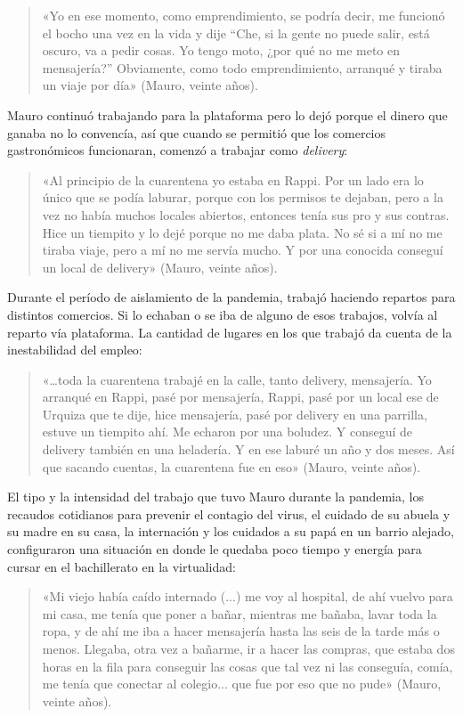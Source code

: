 \begin{quote}
«Yo en ese momento, como emprendimiento, se podría decir, me funcionó el bocho una vez en la vida y dije ``Che, si la gente no puede salir, está oscuro, va a pedir cosas. Yo tengo moto, ¿por qué no me meto en mensajería?'' Obviamente, como todo emprendimiento, arranqué y tiraba un viaje por día» (Mauro, veinte años).
\end{quote}

Mauro continuó trabajando para la plataforma pero lo dejó porque el dinero que ganaba no lo convencía, así que cuando se permitió que los comercios gastronómicos funcionaran, comenzó a trabajar como \emph{delivery}:

\begin{quote}
«Al principio de la cuarentena yo estaba en Rappi. Por un lado era lo único que se podía laburar, porque con los permisos te dejaban, pero a la vez no había muchos locales abiertos, entonces tenía sus pro y sus contras. Hice un tiempito y lo dejé porque no me daba plata. No sé si a mí no me tiraba viaje, pero a mí no me servía mucho. Y por una conocida conseguí un local de delivery» (Mauro, veinte años).
\end{quote}

Durante el período de aislamiento de la pandemia, trabajó haciendo repartos para distintos comercios. Si lo echaban o se iba de alguno de esos trabajos, volvía al reparto vía plataforma. La cantidad de lugares en los que trabajó da cuenta de la inestabilidad del empleo:

\begin{quote}
«\ldots toda la cuarentena trabajé en la calle, tanto delivery, mensajería. Yo arranqué en Rappi, pasé por mensajería, Rappi, pasé por un local ese de Urquiza que te dije, hice mensajería, pasé por delivery en una parrilla, estuve un tiempito ahí. Me echaron por una boludez. Y conseguí de delivery también en una heladería. Y en ese laburé un año y dos meses. Así que sacando cuentas, la cuarentena fue en eso» (Mauro, veinte años).
\end{quote}

El tipo y la intensidad del trabajo que tuvo Mauro durante la pandemia, los recaudos cotidianos para prevenir el contagio del virus, el cuidado de su abuela y su madre en su casa, la internación y los cuidados a su papá en un barrio alejado, configuraron una situación en donde le quedaba poco tiempo y energía para cursar en el bachillerato en la virtualidad:

\begin{quote}
«Mi viejo había caído internado (...) me voy al hospital, de ahí vuelvo para mi casa, me tenía que poner a bañar, mientras me bañaba, lavar toda la ropa, y de ahí me iba a hacer mensajería hasta las seis de la tarde más o menos. Llegaba, otra vez a bañarme, ir a hacer las compras, que estaba dos horas en la fila para conseguir las cosas que tal vez ni las conseguía, comía, me tenía que conectar al colegio... que fue por eso que no pude» (Mauro, veinte años).
\end{quote}

